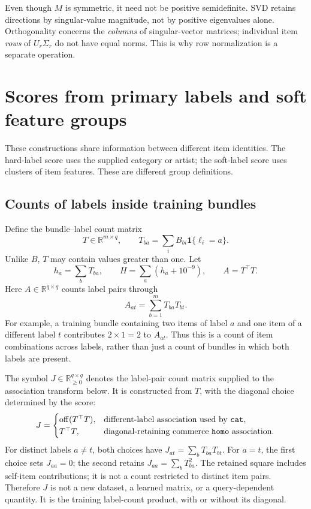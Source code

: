 \documentclass[11pt,a4paper]{article}
\newcommand{\off}{\operatorname{off}}
\DeclareRobustCommand{\key}[1]{\texttt{\detokenize{#1}}}
\newcommand{\ind}{\mathbf 1}
\begin{document}
Even though $M$ is symmetric, it need not be positive semidefinite. SVD retains
directions by singular-value magnitude, not by positive eigenvalues alone.
Orthogonality concerns the \emph{columns} of singular-vector matrices;
individual item \emph{rows} of $U_r\Sigma_r$ do not have equal norms.
This is why row normalization is a separate operation.

\section{Scores from primary labels and soft feature groups}

These constructions share information between different item identities.
The hard-label score uses the supplied category or artist; the soft-label
score uses clusters of item features. These are different group definitions.

\subsection{Counts of labels inside training bundles}
Define the bundle--label count matrix
\[
 T\in\mathbb R^{m\times q},\qquad
 T_{ba}=\sum_iB_{bi}\ind\{\ell_i=a\}.
\]
Unlike $B$, $T$ may contain values greater than one. Let
\[
 h_a=\sum_bT_{ba},\qquad H=\sum_a(h_a+10^{-9}),\qquad A=T^\top T.
\]
Here $A\in\mathbb R^{q\times q}$ counts label pairs through
\[
 A_{at}=\sum_{b=1}^m T_{ba}T_{bt}.
\]
For example, a training bundle containing two items of label $a$ and one item
of a different label $t$ contributes $2\times1=2$ to $A_{at}$.
Thus this is a count of item combinations across labels, rather than just a
count of bundles in which both labels are present.

The symbol $J\in\mathbb R_{\ge0}^{q\times q}$ denotes the label-pair count
matrix supplied to the association transform below. It is constructed from
$T$, with the diagonal choice determined by the score:
\[
 J=\begin{cases}
 \off(T^\top T),&\text{different-label association used by \key{cat}},\\
 T^\top T,&\text{diagonal-retaining commerce \key{homo} association}.
 \end{cases}
\]
For distinct labels $a\ne t$, both choices have
$J_{at}=\sum_bT_{ba}T_{bt}$. For $a=t$, the first choice sets $J_{aa}=0$;
the second retains $J_{aa}=\sum_bT_{ba}^2$. The retained square includes
self-item contributions; it is not a count restricted to distinct item pairs.
Therefore $J$ is not a new dataset, a learned matrix, or a query-dependent
quantity. It is the training label-count product, with or without its diagonal.
\end{document}

